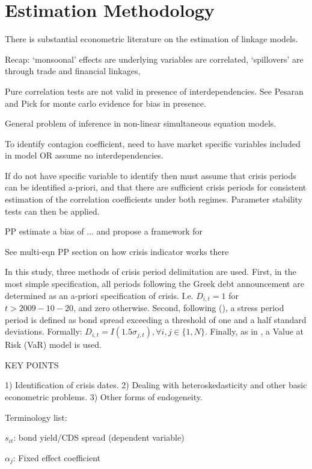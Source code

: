 \documentclass[../base.tex]{subfiles}
\begin{document}
\section{Estimation Methodology}
\label{est}

There is substantial econometric literature on the estimation of linkage models. 

Recap: `monsoonal' effects are underlying variables are correlated, `spillovers' are through trade and financial linkages, 

Pure correlation tests are not valid in presence of interdependencies. See Pesaran and Pick for monte carlo evidence for bias in presence. 

General problem of inference in non-linear simultaneous equation models. 

To identify contagion coefficient, need to have market specific variables included in model OR assume no interdependencies.

If do not have specific variable to identify then must assume that crisis periods can be identified a-priori, and that there are sufficient crisis periods for consistent estimation of the correlation coefficients under both regimes. Parameter stability tests can then be applied. 

PP estimate a bias of ... and propose a framework for 



See multi-eqn PP section on how crisis indicator works there

In this study, three methods of crisis period delimitation are used. First, in the most simple specification, all periods following the Greek debt announcement are determined as an a-priori specification of crisis. I.e. $D_{i,t} = 1$ for $t > 2009-10-20$, and zero otherwise. Second, following (), a stress period period is defined as bond spread exceeding a threshold of one and a half standard deviations. Formally: $D_{i,t} = I(1.5\sigma_{j,t}), \forall i, j \in \{1, N\}$. Finally, as in \cite{metiu2012sovereign}, a Value at Risk (VaR) model is used. 



KEY POINTS

1) Identification of crisis dates.
2) Dealing with heteroskedasticity and other basic econometric problems. 
3) Other forms of endogeneity. 


Terminology list:

$s_{it}$: bond yield/CDS spread (dependent variable)

$\alpha_j$: Fixed effect coefficient
\end{document}
